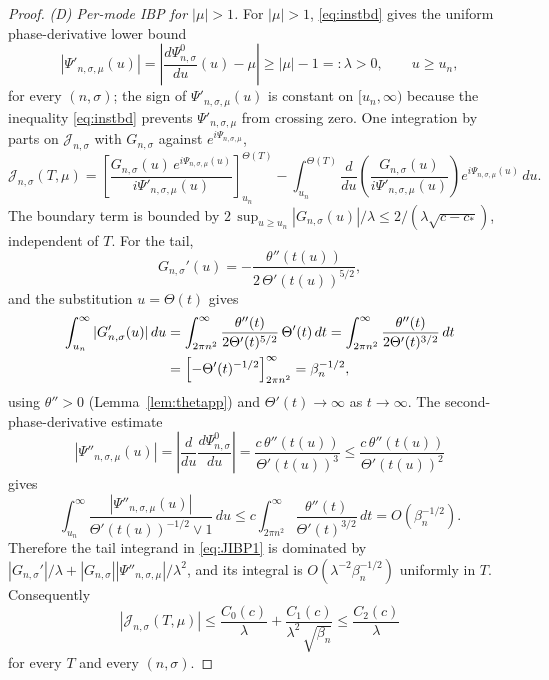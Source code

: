 \documentclass[11pt]{article}
\begin{document}
\begin{proof}
\medskip
\noindent\emph{(D) Per-mode IBP for $|\mu|>1$.} For $|\mu|>1$, \eqref{eq:instbd} gives the uniform phase-derivative lower bound
\begin{equation}\label{eq:Psiprimelb}
|\Psi'_{n,\sigma,\mu}(u)|=\left|\frac{d\Psi^0_{n,\sigma}}{du}(u)-\mu\right|\ge |\mu|-1=:\lambda>0,\qquad u\ge u_n,
\end{equation}
for every $(n,\sigma)$; the sign of $\Psi'_{n,\sigma,\mu}(u)$ is constant on $[u_n,\infty)$ because the inequality \eqref{eq:instbd} prevents $\Psi'_{n,\sigma,\mu}$ from crossing zero. One integration by parts on $\mathcal J_{n,\sigma}$ with $G_{n,\sigma}$ against $e^{i\Psi_{n,\sigma,\mu}}$,
\begin{equation}\label{eq:JIBP1}
\mathcal J_{n,\sigma}(T,\mu)=\left[\frac{G_{n,\sigma}(u)\,e^{i\Psi_{n,\sigma,\mu}(u)}}{i\Psi'_{n,\sigma,\mu}(u)}\right]_{u_n}^{\Theta(T)}-\int_{u_n}^{\Theta(T)}\frac{d}{du}\!\left(\frac{G_{n,\sigma}(u)}{i\Psi'_{n,\sigma,\mu}(u)}\right)e^{i\Psi_{n,\sigma,\mu}(u)}\,du.
\end{equation}
The boundary term is bounded by $2\,\sup_{u\ge u_n}|G_{n,\sigma}(u)|/\lambda\le 2/(\lambda\sqrt{c-c_*})$, independent of $T$. For the tail,
\[
G_{n,\sigma}'(u)=-\frac{\theta''(t(u))}{2\,\Theta'(t(u))^{5/2}},
\]
and the substitution $u=\Theta(t)$ gives
\begin{align*}
\int_{u_n}^{\infty}|G_{n,\sigma}'(u)|\,du
&=\int_{2\pi n^2}^{\infty}\frac{\theta''(t)}{2\Theta'(t)^{5/2}}\,\Theta'(t)\,dt
=\int_{2\pi n^2}^{\infty}\frac{\theta''(t)}{2\Theta'(t)^{3/2}}\,dt\\
&=\Bigl[-\Theta'(t)^{-1/2}\Bigr]_{2\pi n^2}^{\infty}=\beta_n^{-1/2},
\end{align*}
using $\theta''>0$ (Lemma~\ref{lem:thetapp}) and $\Theta'(t)\to\infty$ as $t\to\infty$. The second-phase-derivative estimate
\[
|\Psi''_{n,\sigma,\mu}(u)|=\left|\frac{d}{du}\frac{d\Psi^0_{n,\sigma}}{du}\right|=\frac{c\,\theta''(t(u))}{\Theta'(t(u))^3}\le\frac{c\,\theta''(t(u))}{\Theta'(t(u))^2}
\]
gives
\[
\int_{u_n}^{\infty}\frac{|\Psi''_{n,\sigma,\mu}(u)|}{\Theta'(t(u))^{-1/2}\vee 1}\,du\le c\int_{2\pi n^2}^{\infty}\frac{\theta''(t)}{\Theta'(t)^{3/2}}\,dt=O(\beta_n^{-1/2}).
\]
Therefore the tail integrand in \eqref{eq:JIBP1} is dominated by $|G_{n,\sigma}'|/\lambda+|G_{n,\sigma}||\Psi''_{n,\sigma,\mu}|/\lambda^2$, and its integral is $O(\lambda^{-2}\beta_n^{-1/2})$ uniformly in $T$. Consequently
\begin{equation}\label{eq:Jbd}
|\mathcal J_{n,\sigma}(T,\mu)|\le\frac{C_0(c)}{\lambda}+\frac{C_1(c)}{\lambda^2\,\sqrt{\beta_n}}\le\frac{C_2(c)}{\lambda}
\end{equation}
for every $T$ and every $(n,\sigma)$.


\end{proof}
\end{document}
